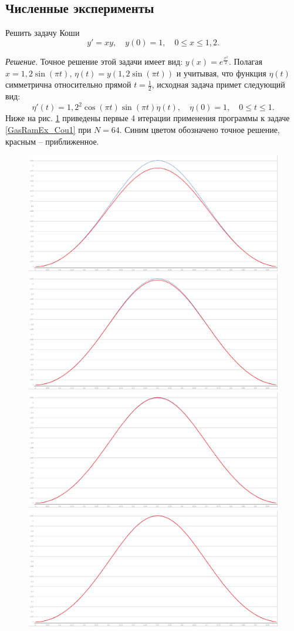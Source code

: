 \subsection{Численные эксперименты}

\begin{example}
Решить задачу Коши
\begin{equation*}
y'=xy, \quad y(0)=1, \quad 0\leq x\leq 1,2.
\end{equation*}
\end{example}
\textit{ Решение}. Точное решение этой задачи имеет вид: $y(x)=e^{\frac{x^2}{2}}$. Полагая $x=1,2\sin(\pi t)$, $\eta(t)=y(1,2\sin(\pi t))$ и учитывая, что функция $\eta(t)$ симметрична относительно прямой $t=\frac12$, исходная задача примет следующий вид:
\begin{equation}\label{GasRamEx_Cou1}
\eta'(t)=1,2^2\cos(\pi t) \sin(\pi t) \eta(t), \quad \eta(0)=1, \quad 0\leq t\leq 1.
\end{equation}
Ниже на рис. \ref{pic1} приведены первые 4 итерации применения программы к задаче \eqref{GasRamEx_Cou1} при $N=64$. Синим цветом обозначено точное решение, красным -- приближенное.
\begin{figure}[h!]
\includegraphics[width=.24\linewidth]{pictures/Ex1_image1_64(1)}
\includegraphics[width=.24\linewidth]{pictures/Ex1_image1_64(2)}
\includegraphics[width=.24\linewidth]{pictures/Ex1_image1_64(3)}
\includegraphics[width=.24\linewidth]{pictures/Ex1_image1_64(4)}
\caption{}
\label{pic1}
\end{figure}


